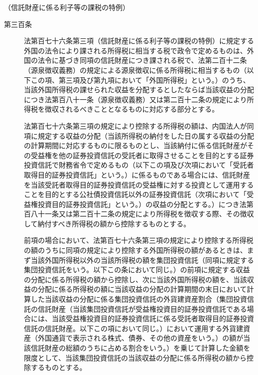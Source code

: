 \documentclass[twocolumn,a4j,10pt]{ltjtarticle}
\begin{document}
\noindent\hspace{10pt}（信託財産に係る利子等の課税の特例）
\begin{description}
\item[第三百条]法第百七十六条第三項（信託財産に係る利子等の課税の特例）に規定する外国の法令により課される所得税に相当する税で政令で定めるものは、外国の法令に基づき同項の信託財産につき課される税で、法第二百十二条（源泉徴収義務）の規定による源泉徴収に係る所得税に相当するもの（以下この項、第三項及び第九項において「外国所得税」という。）のうち、当該外国所得税の課せられた収益を分配するとしたならば当該収益の分配につき法第百八十一条（源泉徴収義務）又は第二百十二条の規定により所得税を徴収されるべきこととなるものに対応する部分とする。
\item[]法第百七十六条第三項の規定により控除する所得税の額は、内国法人が同項に規定する収益の分配（当該所得税の納付をした日の属する収益の分配の計算期間に対応するものに限るものとし、当該納付に係る信託財産がその受益権を他の証券投資信託の受託者に取得させることを目的とする証券投資信託で財務省令で定めるもの（以下この項及び次項において「受託者取得目的証券投資信託」という。）に係るものである場合には、信託財産を当該受託者取得目的証券投資信託の受益権に対する投資として運用することを目的とする公社債投資信託以外の証券投資信託（次項において「受益権投資目的証券投資信託」という。）の収益の分配とする。）につき法第百八十一条又は第二百十二条の規定により所得税を徴収する際、その徴収して納付すべき所得税の額から控除するものとする。
\item[]前項の場合において、法第百七十六条第三項の規定により控除する所得税の額のうちに同項の規定により控除する外国所得税の額があるときは、まず当該外国所得税以外の当該所得税の額を集団投資信託（同項に規定する集団投資信託をいう。以下この条において同じ。）の前項に規定する収益の分配に係る所得税の額から控除し、次に当該外国所得税の額を、当該収益の分配に係る所得税の額に当該収益の分配の計算期間の末日において計算した当該収益の分配に係る集団投資信託の外貨建資産割合（集団投資信託の信託財産（当該集団投資信託が受益権投資目的証券投資信託である場合には、当該受益権投資目的証券投資信託に係る受託者取得目的証券投資信託の信託財産。以下この項において同じ。）において運用する外貨建資産（外国通貨で表示される株式、債券、その他の資産をいう。）の額が当該信託財産の総額のうちに占める割合をいう。）を乗じて計算した金額を限度として、当該集団投資信託の当該収益の分配に係る所得税の額から控除するものとする。

\end{description}
\end{document}

